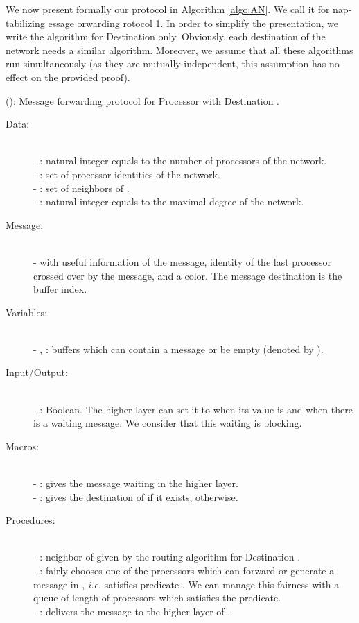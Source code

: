 \documentclass[11pt]{article}
\begin{document}
We now present formally our protocol in Algorithm \ref{algo:AN}. We call it \AN for nap-tabilizing essage orwarding rotocol 1. In order to simplify the presentation, we write the algorithm for Destination  only. Obviously, each destination of the network needs a similar algorithm. Moreover, we assume that all these algorithms run simultaneously (as they are mutually independent, this assumption has no effect on the provided proof).

\begin{algorithm}
\caption{\label{algo:AN}(\AN): Message forwarding protocol for Processor  with Destination .}
\small{
\begin{description}
\item [Data:] ~\\
- : natural integer equals to the number of processors of the network.\\
- : set of processor identities of the network.\\
- : set of neighbors of .\\
- : natural integer equals to the maximal degree of the network.
\item [Message:] ~\\
-  with  useful information of the message,  identity of the last processor crossed over by the message, and  a color. The message destination is the buffer index.
\item [Variables:] ~\\
- , : buffers which can contain a message or be empty (denoted by ).
\item [Input/Output:] ~\\
- : Boolean. The higher layer can set it to  when its value is  and when there is a waiting message. We consider that this waiting is blocking.
\item [Macros:] ~\\
- : gives the message waiting in the higher layer.\\
- : gives the destination of  if it exists,  otherwise.
\item [Procedures:] ~\\
- : neighbor of  given by the routing algorithm for Destination .\\
- : fairly chooses one of the processors which can forward or generate a message in , \emph{i.e.}  satisfies predicate  . We can manage this fairness with a queue of length  of processors which satisfies the predicate.\\
- : delivers the message  to the higher layer of .\\

\end{description}}
\end{algorithm}
\end{document}

